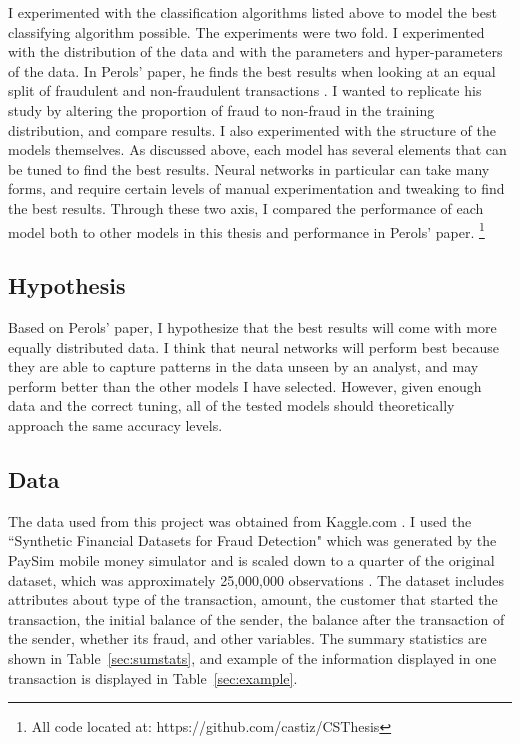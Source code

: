 \documentclass[midd]{thesis}
\begin{document}
I experimented with the classification algorithms listed above to model the best classifying algorithm possible. The experiments were two fold. I experimented with the distribution of the data and with the parameters and hyper-parameters of the data. In Perols' paper, he finds the best results when looking at an equal split of fraudulent and non-fraudulent transactions \cite{Perols2011}. I wanted to replicate his study by altering the proportion of fraud to non-fraud in the training distribution, and compare results. I also experimented with the structure of the models themselves. As discussed above, each model has several elements that can be tuned to find the best results. Neural networks in particular can take many forms, and require certain levels of manual experimentation and tweaking to find the best results. Through these two axis, I compared the performance of each model both to other models in this thesis and performance in Perols' paper. \footnote{All code located at: https://github.com/castiz/CSThesis}  


\subsection{Hypothesis}

Based on Perols' paper, I hypothesize that the best results will come with more equally distributed data. I think that neural networks will perform best because they are able to capture patterns in the data unseen by an analyst, and may perform better than the other models I have selected. However, given enough data and the correct tuning, all of the tested models should theoretically approach the same accuracy levels. 

\subsection{Data}


The data used from this project was obtained from Kaggle.com \cite{paysim}. I used the ``Synthetic Financial Datasets for Fraud Detection" which was generated by the PaySim mobile money simulator and is scaled down to a quarter of the original dataset, which was approximately 25,000,000 observations \cite{paysim}. The dataset includes attributes about type of the transaction, amount, the customer that started the transaction, the initial balance of the sender, the balance after the transaction of the sender, whether its fraud, and other variables. The summary statistics are shown in Table~\ref{sec:sumstats}, and example of the information displayed in one transaction is displayed in Table~\ref{sec:example}.
\end{document}
